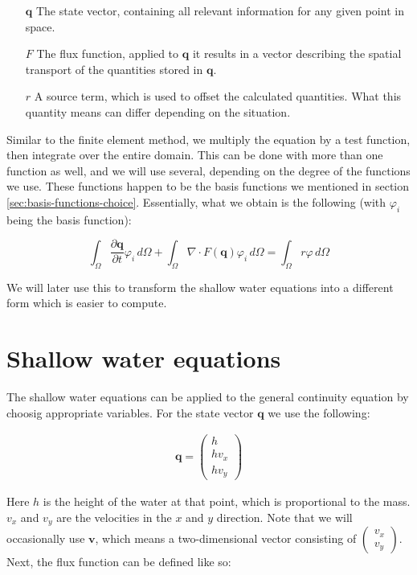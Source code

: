 \documentclass{article}
\newcommand{\pd}[2]{\dfrac{\partial #1}{\partial #2}}
\renewcommand{\phi}{\varphi}
\begin{document}
\begin{itemize}
\item[$\mathbf{q}$] The state vector, containing all relevant information for any given point in space.
\item[$F$] The flux function, applied to $\mathbf{q}$ it results in a vector describing the spatial transport of the quantities stored in $\mathbf{q}$.
\item[$r$] A source term, which is used to offset the calculated quantities. What this quantity means can differ depending on the situation.
\end{itemize}

Similar to the finite element method, we multiply the equation by a test function, then integrate over the entire domain. This can be done with more than one function as well, and we will use several, depending on the degree of the functions we use. These functions happen to be the basis functions we mentioned in section \ref{sec:basis-functions-choice}. Essentially, what we obtain is the following (with $\phi_i$ being the basis function):

\begin{equation}
  \label{eq:general-continuity-equation-discontinuous-galerkin}
  \int_\Omega \pd{\mathbf{q}}{t} \phi_i \,d\Omega + \int_\Omega \nabla \cdot F(\mathbf{q}) \phi_i \,d\Omega = \int_\Omega r \phi \,d\Omega
\end{equation}

We will later use this to transform the shallow water equations into a different form which is easier to compute.

\section{Shallow water equations}
\label{sec:shallow-water-equations}

The shallow water equations can be applied to the general continuity equation by choosig appropriate variables. For the state vector $\mathbf{q}$ we use the following:

\begin{eqnarray*}
  \mathbf{q} =
  \begin{pmatrix}
    h \\ h v_x \\ h v_y
  \end{pmatrix}
\end{eqnarray*}

Here $h$ is the height of the water at that point, which is proportional to the mass. $v_x$ and $v_y$ are the velocities in the $x$ and $y$ direction. Note that we will occasionally use $\mathbf{v}$, which means a two-dimensional vector consisting of $\begin{pmatrix} v_x \\ v_y \end{pmatrix}$. Next, the flux function can be defined like so:
\end{document}
